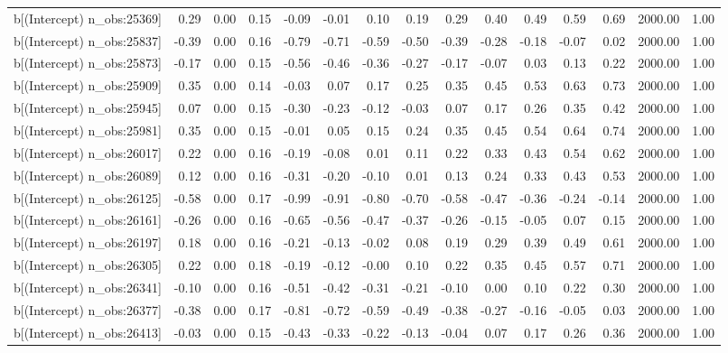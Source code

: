 \begin{table}[ht]
\begin{tabular}{rrrrrrrrrrrrrrr}
  b[(Intercept) n\_obs:25369] & 0.29 & 0.00 & 0.15 & -0.09 & -0.01 & 0.10 & 0.19 & 0.29 & 0.40 & 0.49 & 0.59 & 0.69 & 2000.00 & 1.00 \\ 
  b[(Intercept) n\_obs:25837] & -0.39 & 0.00 & 0.16 & -0.79 & -0.71 & -0.59 & -0.50 & -0.39 & -0.28 & -0.18 & -0.07 & 0.02 & 2000.00 & 1.00 \\ 
  b[(Intercept) n\_obs:25873] & -0.17 & 0.00 & 0.15 & -0.56 & -0.46 & -0.36 & -0.27 & -0.17 & -0.07 & 0.03 & 0.13 & 0.22 & 2000.00 & 1.00 \\ 
  b[(Intercept) n\_obs:25909] & 0.35 & 0.00 & 0.14 & -0.03 & 0.07 & 0.17 & 0.25 & 0.35 & 0.45 & 0.53 & 0.63 & 0.73 & 2000.00 & 1.00 \\ 
  b[(Intercept) n\_obs:25945] & 0.07 & 0.00 & 0.15 & -0.30 & -0.23 & -0.12 & -0.03 & 0.07 & 0.17 & 0.26 & 0.35 & 0.42 & 2000.00 & 1.00 \\ 
  b[(Intercept) n\_obs:25981] & 0.35 & 0.00 & 0.15 & -0.01 & 0.05 & 0.15 & 0.24 & 0.35 & 0.45 & 0.54 & 0.64 & 0.74 & 2000.00 & 1.00 \\ 
  b[(Intercept) n\_obs:26017] & 0.22 & 0.00 & 0.16 & -0.19 & -0.08 & 0.01 & 0.11 & 0.22 & 0.33 & 0.43 & 0.54 & 0.62 & 2000.00 & 1.00 \\ 
  b[(Intercept) n\_obs:26089] & 0.12 & 0.00 & 0.16 & -0.31 & -0.20 & -0.10 & 0.01 & 0.13 & 0.24 & 0.33 & 0.43 & 0.53 & 2000.00 & 1.00 \\ 
  b[(Intercept) n\_obs:26125] & -0.58 & 0.00 & 0.17 & -0.99 & -0.91 & -0.80 & -0.70 & -0.58 & -0.47 & -0.36 & -0.24 & -0.14 & 2000.00 & 1.00 \\ 
  b[(Intercept) n\_obs:26161] & -0.26 & 0.00 & 0.16 & -0.65 & -0.56 & -0.47 & -0.37 & -0.26 & -0.15 & -0.05 & 0.07 & 0.15 & 2000.00 & 1.00 \\ 
  b[(Intercept) n\_obs:26197] & 0.18 & 0.00 & 0.16 & -0.21 & -0.13 & -0.02 & 0.08 & 0.19 & 0.29 & 0.39 & 0.49 & 0.61 & 2000.00 & 1.00 \\ 
  b[(Intercept) n\_obs:26305] & 0.22 & 0.00 & 0.18 & -0.19 & -0.12 & -0.00 & 0.10 & 0.22 & 0.35 & 0.45 & 0.57 & 0.71 & 2000.00 & 1.00 \\ 
  b[(Intercept) n\_obs:26341] & -0.10 & 0.00 & 0.16 & -0.51 & -0.42 & -0.31 & -0.21 & -0.10 & 0.00 & 0.10 & 0.22 & 0.30 & 2000.00 & 1.00 \\ 
  b[(Intercept) n\_obs:26377] & -0.38 & 0.00 & 0.17 & -0.81 & -0.72 & -0.59 & -0.49 & -0.38 & -0.27 & -0.16 & -0.05 & 0.03 & 2000.00 & 1.00 \\ 
  b[(Intercept) n\_obs:26413] & -0.03 & 0.00 & 0.15 & -0.43 & -0.33 & -0.22 & -0.13 & -0.04 & 0.07 & 0.17 & 0.26 & 0.36 & 2000.00 & 1.00 \\ 

\end{tabular}
\end{table}
